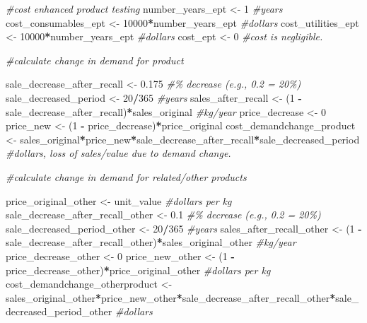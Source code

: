 \documentclass[
]{article}
\newenvironment{Shaded}{\begin{snugshade}}{\end{snugshade}}
\newcommand{\CommentTok}[1]{\textcolor[rgb]{0.56,0.35,0.01}{\textit{#1}}}
\newcommand{\DecValTok}[1]{\textcolor[rgb]{0.00,0.00,0.81}{#1}}
\newcommand{\FloatTok}[1]{\textcolor[rgb]{0.00,0.00,0.81}{#1}}
\newcommand{\NormalTok}[1]{#1}
\newcommand{\OtherTok}[1]{\textcolor[rgb]{0.56,0.35,0.01}{#1}}
\newcommand{\SpecialCharTok}[1]{\textcolor[rgb]{0.81,0.36,0.00}{\textbf{#1}}}
\begin{document}
\begin{Shaded}
\begin{Highlighting}[]
\CommentTok{\#cost enhanced product testing}
\NormalTok{number\_years\_ept }\OtherTok{\textless{}{-}} \DecValTok{1} \CommentTok{\#years}
\NormalTok{cost\_consumables\_ept }\OtherTok{\textless{}{-}} \DecValTok{10000}\SpecialCharTok{*}\NormalTok{number\_years\_ept }\CommentTok{\#dollars}
\NormalTok{cost\_utilities\_ept }\OtherTok{\textless{}{-}} \DecValTok{10000}\SpecialCharTok{*}\NormalTok{number\_years\_ept }\CommentTok{\#dollars}
\NormalTok{cost\_ept }\OtherTok{\textless{}{-}} \DecValTok{0} \CommentTok{\#cost is negligible.}



\CommentTok{\#calculate change in demand for product}

\NormalTok{sale\_decrease\_after\_recall }\OtherTok{\textless{}{-}} \FloatTok{0.175} \CommentTok{\#\% decrease (e.g., 0.2 = 20\%) }
\NormalTok{sale\_decreased\_period }\OtherTok{\textless{}{-}} \DecValTok{20}\SpecialCharTok{/}\DecValTok{365} \CommentTok{\#years}
\NormalTok{sales\_after\_recall }\OtherTok{\textless{}{-}}\NormalTok{ (}\DecValTok{1} \SpecialCharTok{{-}}\NormalTok{ sale\_decrease\_after\_recall)}\SpecialCharTok{*}\NormalTok{sales\_original }\CommentTok{\#kg/year}
\NormalTok{price\_decrease }\OtherTok{\textless{}{-}} \DecValTok{0} 
\NormalTok{price\_new }\OtherTok{\textless{}{-}}\NormalTok{ (}\DecValTok{1} \SpecialCharTok{{-}}\NormalTok{ price\_decrease)}\SpecialCharTok{*}\NormalTok{price\_original}
\NormalTok{cost\_demandchange\_product }\OtherTok{\textless{}{-}}\NormalTok{ sales\_original}\SpecialCharTok{*}\NormalTok{price\_new}\SpecialCharTok{*}\NormalTok{sale\_decrease\_after\_recall}\SpecialCharTok{*}\NormalTok{sale\_decreased\_period }\CommentTok{\#dollars, loss of sales/value due to demand change.}


\CommentTok{\#calculate change in demand for related/other products }

\NormalTok{price\_original\_other }\OtherTok{\textless{}{-}}\NormalTok{ unit\_value }\CommentTok{\#dollars per kg}
\NormalTok{sale\_decrease\_after\_recall\_other }\OtherTok{\textless{}{-}} \FloatTok{0.1} \CommentTok{\#\% decrease (e.g., 0.2 = 20\%)}
\NormalTok{sale\_decreased\_period\_other }\OtherTok{\textless{}{-}} \DecValTok{20}\SpecialCharTok{/}\DecValTok{365} \CommentTok{\#years}
\NormalTok{sales\_after\_recall\_other }\OtherTok{\textless{}{-}}\NormalTok{ (}\DecValTok{1} \SpecialCharTok{{-}}\NormalTok{ sale\_decrease\_after\_recall\_other)}\SpecialCharTok{*}\NormalTok{sales\_original\_other }\CommentTok{\#kg/year}
\NormalTok{price\_decrease\_other }\OtherTok{\textless{}{-}} \DecValTok{0} 
\NormalTok{price\_new\_other }\OtherTok{\textless{}{-}}\NormalTok{ (}\DecValTok{1} \SpecialCharTok{{-}}\NormalTok{ price\_decrease\_other)}\SpecialCharTok{*}\NormalTok{price\_original\_other }\CommentTok{\#dollars per kg}
\NormalTok{cost\_demandchange\_otherproduct }\OtherTok{\textless{}{-}}\NormalTok{ sales\_original\_other}\SpecialCharTok{*}\NormalTok{price\_new\_other}\SpecialCharTok{*}\NormalTok{sale\_decrease\_after\_recall\_other}\SpecialCharTok{*}\NormalTok{sale\_decreased\_period\_other }\CommentTok{\#dollars}



\end{Highlighting}
\end{Shaded}
\end{document}
